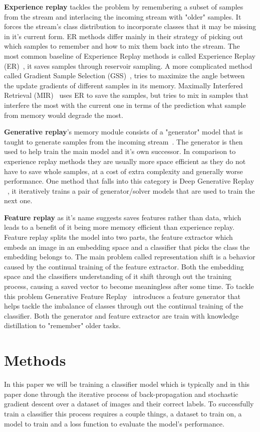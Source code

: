 \documentclass[oneside]{ctuthesis}
\begin{document}
\textbf{Experience replay} tackles the problem by remembering a subset of samples from the stream and interlacing the incoming stream with "older" samples. It forces the stream's class distribution to incorporate classes that it may be missing in it's current form. ER methods differ mainly in their strategy of picking out which samples to remember and how to mix them back into the stream. The most common baseline of Experience Replay methods is called Experience Replay (ER)~\cite{ER}, it saves samples through reservoir sampling. A more complicated method called Gradient Sample Selection (GSS)~\cite{GSS}, tries to maximize the angle between the update gradients of different samples in its memory. Maximally Interfered Retrieval (MIR)~\cite{MIR} uses ER to save the samples, but tries to mix in samples that interfere the most with the current one in terms of the prediction what sample from memory would degrade the most. 

\textbf{Generative replay}'s memory module consists of a "generator" model that is taught to generate samples from the incoming stream~\cite{clsurvey}. The generator is then used to help train the main model and it's own successor. In comparison to experience replay methods they are usually more space efficient as they do not have to save whole samples, at a cost of extra complexity and generally worse performance. One method that falls into this category is Deep Generative Replay ~\cite{DGR}, it iteratively trains a pair of generator/solver models that are used to train the next one.  

\textbf{Feature replay} as it's name suggests saves features rather than data, which leads to a benefit of it being more memory efficient than experience replay. Feature replay splits the model into two parts, the feature extractor which embeds an image in an embedding space and a classifier that picks the class the embedding belongs to. The main problem called representation shift is a behavior caused by the continual training of the feature extractor. Both the embedding space and the classifiers understanding of it shift through out the training process, causing a saved vector to become meaningless after some time. To tackle this problem Generative Feature Replay~\cite{GFR} introduces a feature generator that helps tackle the imbalance of classes through out the continual training of the classifier. Both the generator and feature extractor are train with knowledge distillation to "remember" older tasks.

\chapter{Methods}
In this paper we will be training a classifier model which is typically and in this paper done through the iterative process of back-propagation and stochastic gradient descent over a dataset of images and their correct labels. To successfully train a classifier this process requires a couple things, a dataset to train on, a model to train and a loss function to evaluate the model's performance.
\end{document}
